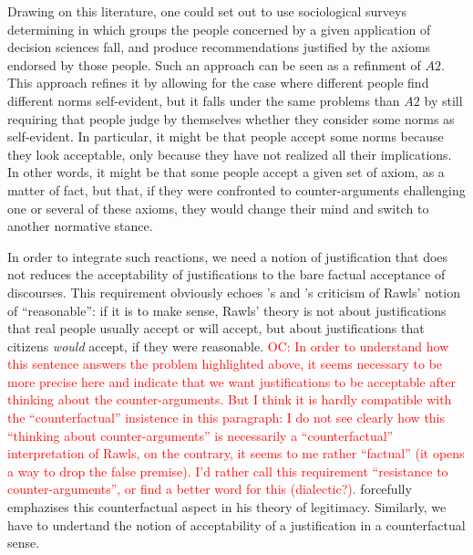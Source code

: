\documentclass[preprint, french, english, 11pt, authoryear]{elsarticle}%
\newcommand{\commentOC}[1]{\textcolor{red}{OC: #1}}
\begin{document}
Drawing on this literature, one could set out to use sociological surveys determining in which groups the people concerned by a given application of decision sciences fall, and produce recommendations justified by the axioms endorsed by those people.
Such an approach can be seen as a refinment of $A2$. This approach refines it by allowing for the case where different people find different norms self-evident, but it falls under the same problems than $A2$ by still requiring that people judge by themselves whether they consider some norms as self-evident. In particular, it might be that people accept some norms because they look acceptable, only because they have not realized all their implications.  In other words, it might be that some people accept a given set of axiom, as a matter of fact, but that, if they were confronted to counter-arguments challenging one or several of these axioms, they would change their mind and switch to another normative stance.

In order to integrate such reactions, we need a notion of justification that does not reduces the acceptability of justifications to the bare factual acceptance of discourses. This requirement obviously echoes \cite{habermas_reconciliation_1995}'s and \cite{estlund_democratic_2009}'s criticism of Rawls' notion of “reasonable”: if it is to make sense, Rawls' theory is not about justifications that real people usually accept or will accept, but about justifications that citizens \emph{would} accept, if they were reasonable. \commentOC{In order to understand how this sentence answers the problem highlighted above, it seems necessary to be more precise here and indicate that we want justifications to be acceptable after thinking about the counter-arguments. But I think it is hardly compatible with the “counterfactual” insistence in this paragraph: I do not see clearly how this “thinking about counter-arguments” is necessarily a “counterfactual” interpretation of Rawls, on the contrary, it seems to me rather “factual” (it opens a way to drop the false premise). I’d rather call this requirement “resistance to counter-arguments”, or find a better word for this (dialectic?).} \citet{habermas_faktizitat_1992} forcefully emphazises this counterfactual aspect in his theory of legitimacy. Similarly, we have to undertand the notion of acceptability of a justification in a counterfactual sense. 
\end{document}
